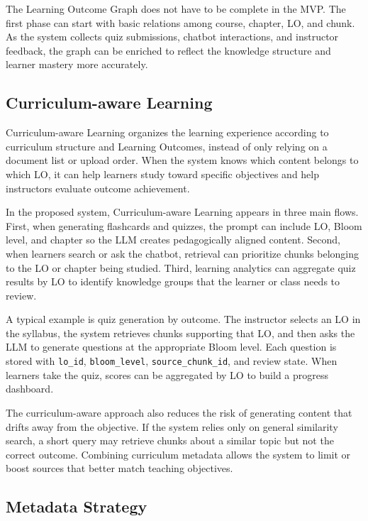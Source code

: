 The Learning Outcome Graph does not have to be complete in the MVP. The
first phase can start with basic relations among course, chapter, LO, and
chunk. As the system collects quiz submissions, chatbot interactions, and
instructor feedback, the graph can be enriched to reflect the knowledge
structure and learner mastery more accurately.

\subsection{Curriculum-aware Learning}
\label{subsec:curriculum-aware-learning}

Curriculum-aware Learning organizes the learning experience according to
curriculum structure and Learning Outcomes, instead of only relying on a
document list or upload order. When the system knows which content belongs
to which LO, it can help learners study toward specific objectives and
help instructors evaluate outcome achievement.

In the proposed system, Curriculum-aware Learning appears in three main
flows. First, when generating flashcards and quizzes, the prompt can
include LO, Bloom level, and chapter so the LLM creates pedagogically
aligned content. Second, when learners search or ask the chatbot,
retrieval can prioritize chunks belonging to the LO or chapter being
studied. Third, learning analytics can aggregate quiz results by LO to
identify knowledge groups that the learner or class needs to review.

A typical example is quiz generation by outcome. The instructor selects
an LO in the syllabus, the system retrieves chunks supporting that LO, and
then asks the LLM to generate questions at the appropriate Bloom level.
Each question is stored with \texttt{lo\_id}, \texttt{bloom\_level},
\texttt{source\_chunk\_id}, and review state. When learners take the quiz,
scores can be aggregated by LO to build a progress dashboard.

The curriculum-aware approach also reduces the risk of generating content
that drifts away from the objective. If the system relies only on general
similarity search, a short query may retrieve chunks about a similar topic
but not the correct outcome. Combining curriculum metadata allows the
system to limit or boost sources that better match teaching objectives.

\subsection{Metadata Strategy}
\label{subsec:metadata-strategy}

